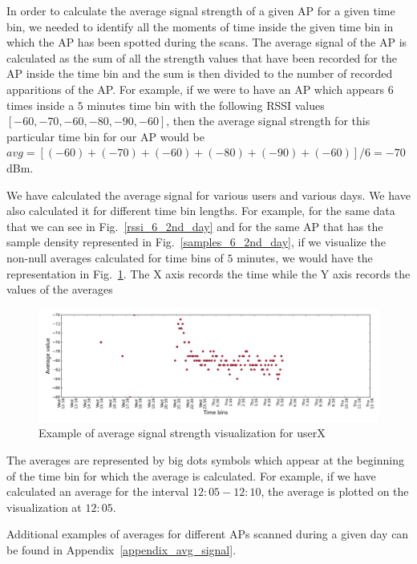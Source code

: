 In order to calculate the average signal strength of a given AP for a given time
bin, we needed to identify all the moments of time inside the given time bin in which
the AP has been spotted during the scans. The average signal of the AP is
calculated as the sum of all the strength values that have been recorded for the
AP inside the time bin and the sum is then divided to the number of recorded
apparitions of the AP. For example, if we were to have an AP which appears $6$
times inside a $5$ minutes time bin with the following RSSI values $[-60, -70,
-60, -80, -90, -60]$, then the average signal strength for this particular time
bin for our AP would be $avg = [(-60) + (-70) + (-60) + (-80) + (-90) +
(-60)] / 6= -70$ dBm.

We have calculated the average signal for various users and various days. We
have also calculated it for different time bin lengths. For example, for the
same data that we can see in Fig.~\ref{rssi_6_2nd_day} and for the same AP that has
the sample density represented in Fig.~\ref{samples_6_2nd_day}, if we visualize
the non-null averages calculated for time bins of $5$ minutes, we would have the
representation in Fig.~\ref{user_6_avg_1d_5m}. The X axis records the time
while the Y axis records the values of the averages

\begin{figure}[h]
\centering
\includegraphics[width =\textwidth]{figures/combinations/user_6_sorted_1days_plot_14280_avg_sig.png}
\caption{Example of average signal strength visualization for userX}
\label{user_6_avg_1d_5m}
\end{figure}

The averages are represented by big dots symbols which appear at the beginning
of the time bin for which the average is calculated. For example, if we have
calculated an average for the interval $12:05 - 12:10$, the average is plotted
on the visualization at $12:05$. 

Additional examples of averages for different APs scanned during a given day can
be found in Appendix~\ref{appendix_avg_signal}.

